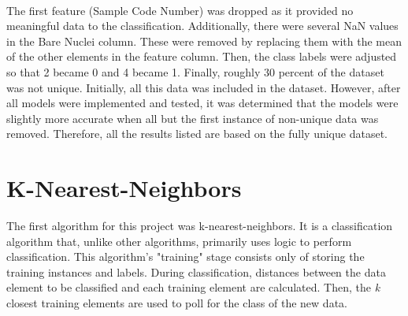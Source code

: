 \documentclass[12pt]{article}
\begin{document}
    \paragraph{}
    The first feature (Sample Code Number) was dropped as it provided no meaningful data to the classification. Additionally, there were several NaN values in the Bare Nuclei column. These were removed by replacing them with the mean of the other elements in the feature column. Then, the class labels were adjusted so that 2 became 0 and 4 became 1. Finally, roughly 30 percent of the dataset was not unique. Initially, all this data was included in the dataset. However, after all models were implemented and tested, it was determined that the models were slightly more accurate when all but the first instance of non-unique data was removed. Therefore, all the results listed are based on the fully unique dataset.
    
    \section{K-Nearest-Neighbors}
    The first algorithm for this project was k-nearest-neighbors. It is a classification algorithm that, unlike other algorithms, primarily uses logic to perform classification. This algorithm's "training" stage consists only of storing the training instances and labels. During classification, distances between the data element to be classified and each training element are calculated. Then, the \textit{k} closest training elements are used to poll for the class of the new data.
\end{document}
